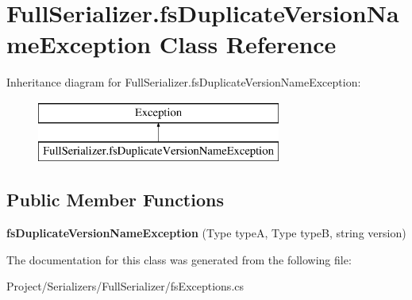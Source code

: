 \hypertarget{class_full_serializer_1_1fs_duplicate_version_name_exception}{}\section{Full\+Serializer.\+fs\+Duplicate\+Version\+Name\+Exception Class Reference}
\label{class_full_serializer_1_1fs_duplicate_version_name_exception}
Inheritance diagram for Full\+Serializer.\+fs\+Duplicate\+Version\+Name\+Exception\+:\begin{figure}[H]
\begin{center}
\leavevmode
\includegraphics[height=2.000000cm]{class_full_serializer_1_1fs_duplicate_version_name_exception}
\end{center}
\end{figure}
\subsection*{Public Member Functions}
\begin{DoxyCompactItemize}
\item 
\mbox{\label{class_full_serializer_1_1fs_duplicate_version_name_exception_a848dfbf7e1f94b5cbc894e7050541269}} 
{\bfseries fs\+Duplicate\+Version\+Name\+Exception} (Type typeA, Type typeB, string version)
\end{DoxyCompactItemize}


The documentation for this class was generated from the following file\+:\begin{DoxyCompactItemize}
\item 
Project/\+Serializers/\+Full\+Serializer/fs\+Exceptions.\+cs\end{DoxyCompactItemize}
